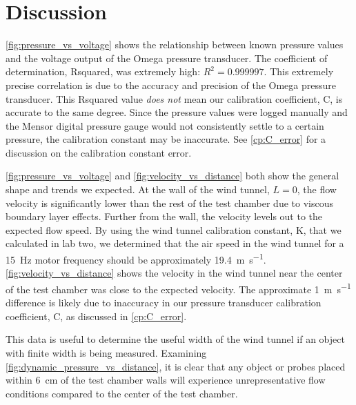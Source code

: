 \chapter{Discussion}
\label{cp:discussion}

\autoref{fig:pressure_vs_voltage} shows the relationship between known pressure values and the voltage output of the Omega pressure transducer. The coefficient of determination, \gls{Rsquared}, was extremely high: $R^2 = 0.999997$. This extremely precise correlation is due to the accuracy and precision of the Omega pressure transducer. This \gls{Rsquared} value \textit{does not} mean our calibration coefficient, \gls{C}, is accurate to the same degree. Since the pressure values were logged manually and the Mensor digital pressure gauge would not consistently settle to a certain pressure, the calibration constant may be inaccurate. See \autoref{cp:C_error} for a discussion on the calibration constant error.

\autoref{fig:pressure_vs_voltage} and \autoref{fig:velocity_vs_distance} both show the general shape and trends we expected. At the wall of the wind tunnel, $L=0$, the flow velocity is significantly lower than the rest of the test chamber due to viscous boundary layer effects. Further from the wall, the velocity levels out to the expected flow speed. By using the wind tunnel calibration constant, \gls{K}, that we calculated in lab two, we determined that the air speed in the wind tunnel for a \qty{15}{\hertz} motor frequency should be approximately \qty{19.4}{\meter\per\second}. \autoref{fig:velocity_vs_distance} shows the velocity in the wind tunnel near the center of the test chamber was close to the expected velocity. The approximate \qty{1}{\meter\per\second} difference is likely due to inaccuracy in our pressure transducer calibration coefficient, \gls{C}, as discussed in \autoref{cp:C_error}.

This data is useful to determine the useful width of the wind tunnel if an object with finite width is being measured. Examining \autoref{fig:dynamic_pressure_vs_distance}, it is clear that any object or probes placed within \qty{6}{\centi\meter} of the test chamber walls will experience unrepresentative flow conditions compared to the center of the test chamber.

